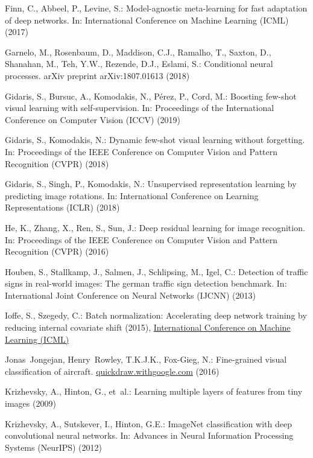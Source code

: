 \documentclass[runningheads]{llncs}
\begin{document}
\begin{thebibliography}{10}
Finn, C., Abbeel, P., Levine, S.: Model-agnostic meta-learning for fast
  adaptation of deep networks. In: International Conference on Machine Learning
  (ICML) (2017)

Garnelo, M., Rosenbaum, D., Maddison, C.J., Ramalho, T., Saxton, D., Shanahan,
  M., Teh, Y.W., Rezende, D.J., Eslami, S.: Conditional neural processes. arXiv
  preprint arXiv:1807.01613  (2018)

Gidaris, S., Bursuc, A., Komodakis, N., P{\'e}rez, P., Cord, M.: Boosting
  few-shot visual learning with self-supervision. In: Proceedings of the
  International Conference on Computer Vision (ICCV) (2019)

Gidaris, S., Komodakis, N.: Dynamic few-shot visual learning without
  forgetting. In: Proceedings of the IEEE Conference on Computer Vision and
  Pattern Recognition (CVPR) (2018)

Gidaris, S., Singh, P., Komodakis, N.: Unsupervised representation learning by
  predicting image rotations. In: International Conference on Learning
  Representations (ICLR) (2018)

He, K., Zhang, X., Ren, S., Sun, J.: Deep residual learning for image
  recognition. In: Proceedings of the IEEE Conference on Computer Vision and
  Pattern Recognition (CVPR) (2016)

Houben, S., Stallkamp, J., Salmen, J., Schlipsing, M., Igel, C.: Detection of
  traffic signs in real-world images: The german traffic sign detection
  benchmark. In: International Joint Conference on Neural Networks (IJCNN)
  (2013)

Ioffe, S., Szegedy, C.: Batch normalization: Accelerating deep network training
  by reducing internal covariate shift (2015), \url{International Conference on
  Machine Learning (ICML)}

Jonas~Jongejan, Henry~Rowley, T.K.J.K., Fox-Gieg, N.: Fine-grained visual
  classification of aircraft. \url{quickdraw.withgoogle.com} (2016)

Krizhevsky, A., Hinton, G., et~al.: Learning multiple layers of features from
  tiny images  (2009)

Krizhevsky, A., Sutskever, I., Hinton, G.E.: {ImageNet} classification with
  deep convolutional neural networks. In: Advances in Neural Information
  Processing Systems (NeurIPS) (2012)


\end{thebibliography}
\end{document}
